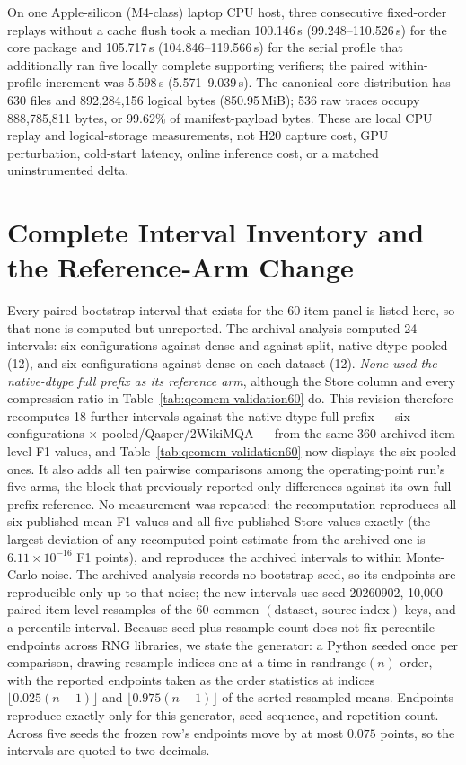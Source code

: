 \documentclass{article}
\begin{document}
On one Apple-silicon (M4-class) laptop CPU host, three consecutive fixed-order
replays without a
cache flush took a median 100.146\,s (99.248--110.526\,s) for the core package
and 105.717\,s (104.846--119.566\,s) for the serial profile that additionally
ran five locally complete supporting verifiers; the paired within-profile
increment was 5.598\,s (5.571--9.039\,s).  The canonical core distribution has
630 files and 892,284,156 logical bytes (850.95\,MiB); 536 raw traces occupy
888,785,811 bytes, or 99.62\% of manifest-payload bytes.  These are local CPU
replay and logical-storage measurements, not H20 capture cost, GPU perturbation,
cold-start latency, online inference cost, or a matched uninstrumented delta.

\section{Complete Interval Inventory and the Reference-Arm Change}
\label{app:all-intervals}

Every paired-bootstrap interval that exists for the 60-item panel is listed
here, so that none is computed but unreported. The archival analysis computed
24 intervals: six configurations against dense and against split, native dtype
pooled (12), and six configurations against dense on each dataset (12).
\emph{None used the native-dtype full prefix as its reference arm}, although
the Store column and every compression ratio in
Table~\ref{tab:qcomem-validation60} do. This revision therefore recomputes 18
further intervals against the native-dtype full prefix --- six configurations
$\times$ pooled/Qasper/2WikiMQA --- from the same 360 archived item-level F1
values, and Table~\ref{tab:qcomem-validation60} now displays the six pooled
ones. It also adds all ten pairwise comparisons among the operating-point
run's five arms, the block that previously reported only differences against
its own full-prefix reference. No measurement was repeated: the recomputation
reproduces all six published mean-F1 values and all five published Store
values exactly (the largest deviation of any recomputed point estimate from
the archived one is $6.11\times10^{-16}$ F1 points), and reproduces the
archived intervals to within Monte-Carlo noise. The archived analysis records
no bootstrap seed, so its endpoints are reproducible only up to that noise;
the new intervals use seed 20260902, 10,000 paired item-level resamples of the
60 common $(\mathrm{dataset},\ \mathrm{source\ index})$ keys, and a percentile
interval. Because seed plus resample count does not fix percentile endpoints
across RNG libraries, we state the generator: a Python 
seeded once per comparison, drawing resample indices one at a time in
$\mathrm{randrange}(n)$ order, with the reported endpoints taken as the order
statistics at indices $\lfloor 0.025(n-1)\rfloor$ and $\lfloor
0.975(n-1)\rfloor$ of the sorted resampled means. Endpoints reproduce exactly
only for this generator, seed sequence, and repetition count. Across five
seeds the frozen row's endpoints move by at most $0.075$ points, so the
intervals are quoted to two decimals.
\end{document}
